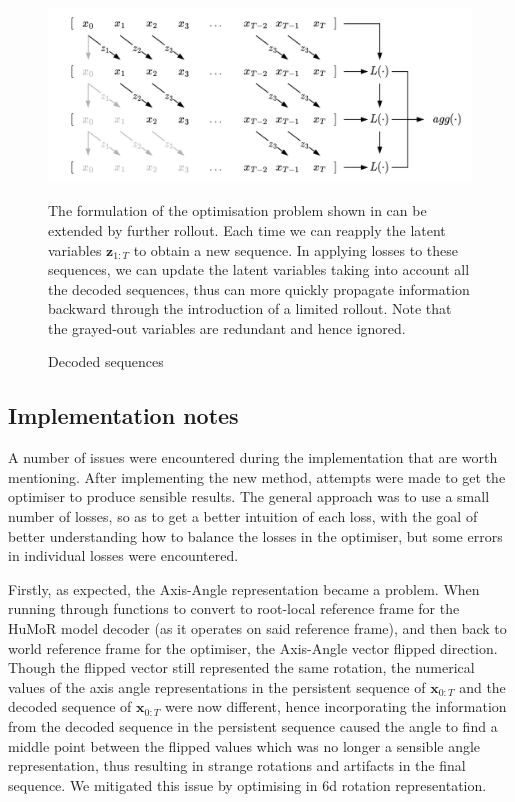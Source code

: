 \begin{figure}
    \centering
    \includegraphics[width=1\textwidth]{Figures/humor/improvement/Rollout_overlap.png}
    \caption{Decoded sequences}
    \label{fig:dimm_decoded_sequences}
    \medskip
    \small
    The formulation of the optimisation problem shown in  can be extended by further rollout. Each time we can reapply the latent variables $\mathbf{z}_{1:T}$ to obtain a new sequence. In applying losses to these sequences, we can update the latent variables taking into account all the decoded sequences, thus can more quickly propagate information backward through the introduction of a limited rollout. Note that the grayed-out variables are redundant and hence ignored.
\end{figure}





\subsection{Implementation notes}

A number of issues were encountered during the implementation that are worth mentioning. After implementing the new method, attempts were made to get the optimiser to produce sensible results. The general approach was to use a small number of losses, so as to get a better intuition of each loss, with the goal of better understanding how to balance the losses in the optimiser, but some errors in individual losses were encountered.

Firstly, as expected, the Axis-Angle representation became a problem. When running through functions to convert to root-local reference frame for the HuMoR model decoder (as it operates on said reference frame), and then back to world reference frame for the optimiser, the Axis-Angle vector flipped direction. Though the flipped vector still represented the same rotation, the numerical values of the axis angle representations in the persistent sequence of $\mathbf{x}_{0:T}$ and the decoded sequence of $\mathbf{x}_{0:T}$ were now different, hence incorporating the information from the decoded sequence in the persistent sequence caused the angle to find a middle point between the flipped values which was no longer a sensible angle representation, thus resulting in strange rotations and artifacts in the final sequence. We mitigated this issue by optimising in 6d rotation representation.

